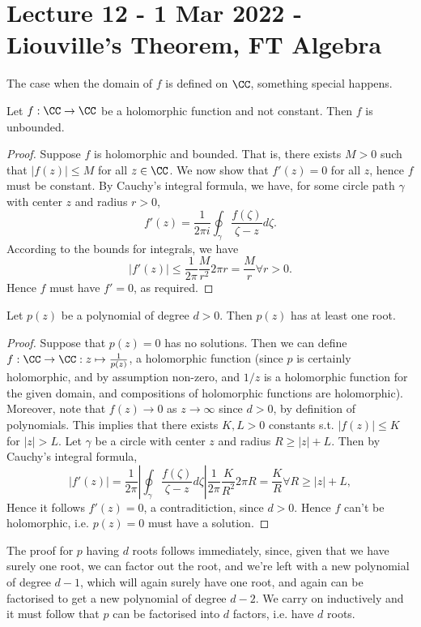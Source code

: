\section{Lecture 12 - 1 Mar 2022 - Liouville's Theorem, FT Algebra}
The case when the domain of $f$ is defined on $\CC$, something special happens.
\begin{theorem}
  Let $f:\CC\to\CC$ be a holomorphic function and not constant. Then $f$ is
  unbounded.
  \label{<+label+>}
\end{theorem}
\begin{proof}
  Suppose $f$ is holomorphic and bounded. That is, there exists $M>0$ such that
  $|f(z)|\leq M$ for all $z\in\CC$. We now show that $f'(z)=0$ for all $z$,
  hence $f$ must be constant. By Cauchy's integral formula, we have, for some
  circle path $\gamma$ with center $z$ and radius $r>0$,
  \[f'(z)=\frac{1}{2\pi i} \oint_{\gamma}\frac{f(\zeta)}{\zeta-z}d\zeta.\]
  According to the bounds for integrals, we have 
  \[|f'(z)|\leq \frac{1}{2\pi} \frac{M}{r^2} 2\pi r = \frac{M}{r} \forall r>0. \]
  Hence $f$ must have $f'=0$, as required.
\end{proof}

\begin{theorem}
  Let $p(z)$ be a polynomial of degree $d>0$. Then $p(z)$  has at least one
  root.
  \label{<+label+>}
\end{theorem}
\begin{proof}
  Suppose that $p(z)=0$ has no solutions. Then we can define
  $f:\CC\to\CC:z\mapsto \frac{1}{p(z)}$, a holomorphic function (since $p$ is
  certainly holomorphic, and by assumption non-zero, and $1/z$ is a holomorphic
  function for the given domain, and compositions of holomorphic functions are
  holomorphic). Moreover, note that $f(z)\to 0$ as $z\to\infty$ since $d>0$, by
  definition of polynomials. This implies that there exists $K,L>0$ constants
  s.t. $|f(z)|\leq K$ for $|z|>L$. Let $\gamma$ be a circle with center $z$ and
  radius $R\geq |z|+L$. Then by Cauchy's integral formula,
  \[|f'(z)|= \frac{1}{2\pi} \left|
  \oint_{\gamma}\frac{f(\zeta)}{\zeta-z}d\zeta\right| \frac{1}{2\pi}
  \frac{K}{R^2} 2\pi R = \frac{K}{R} \forall R\geq |z|+L,\]
  Hence it follows $f'(z)=0$, a contraditiction, since $d>0$. Hence $f$ can't be
  holomorphic, i.e. $p(z)=0$ must have a solution.
\end{proof}
The proof for $p$ having $d$ roots follows immediately, since, given that we
have surely one root, we can factor out the root, and we're left with a new
polynomial of degree $d-1$, which will again surely have one root, and again can
be factorised to get a new polynomial of degree $d-2$. We carry on inductively
and it must follow that $p$ can be factorised into $d$ factors, i.e. have $d$
roots.
